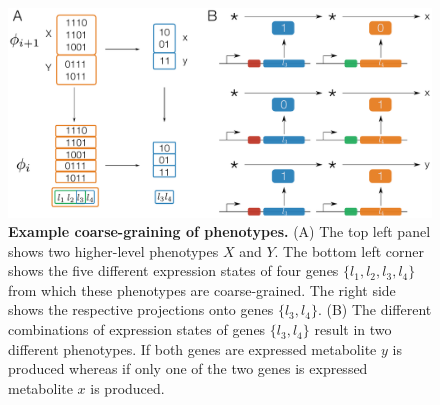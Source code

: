 \begin{figure}[!ht]
\centering
\noindent\includegraphics[width=0.9\columnwidth]{fig/phenotypehierarchy.pdf}
\caption{{\bf Example coarse-graining of phenotypes.} (A) The top left panel shows two higher-level phenotypes $X$ and $Y$. The bottom left corner shows the five different expression states of four genes $\{l_1,l_2,l_3,l_4\}$ from which these phenotypes are coarse-grained. The right side shows the respective projections onto genes $\{l_3,l_4\}$. (B) The different combinations of expression states of genes $\{l_3,l_4\}$ result in two different phenotypes. If both genes are expressed metabolite $y$ is produced whereas if only one of the two genes is expressed metabolite $x$ is produced.}
\label{fig:phenotypehierarchy}
\end{figure}

